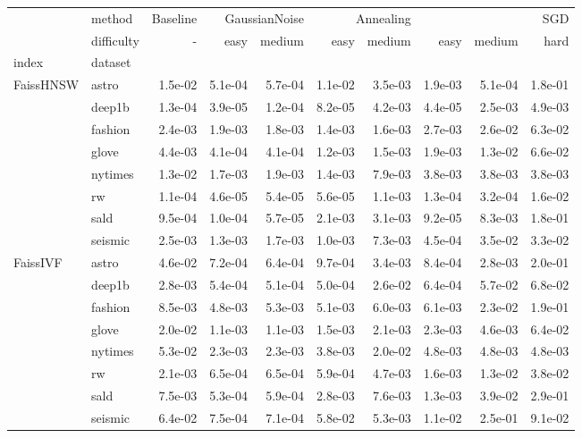 \begin{tabular}{llrrrrrrrr}
\toprule
 & method & Baseline & \multicolumn{2}{r}{GaussianNoise} & \multicolumn{2}{r}{Annealing} & \multicolumn{3}{r}{SGD} \\
 & difficulty & - & easy & medium & easy & medium & easy & medium & hard \\
index & dataset &  &  &  &  &  &  &  &  \\
\midrule
\multirow[t]{8}{*}{FaissHNSW} & astro & 1.5e-02 & 5.1e-04 & 5.7e-04 & 1.1e-02 & 3.5e-03 & 1.9e-03 & 5.1e-04 & 1.8e-01 \\
 & deep1b & 1.3e-04 & 3.9e-05 & 1.2e-04 & 8.2e-05 & 4.2e-03 & 4.4e-05 & 2.5e-03 & 4.9e-03 \\
 & fashion & 2.4e-03 & 1.9e-03 & 1.8e-03 & 1.4e-03 & 1.6e-03 & 2.7e-03 & 2.6e-02 & 6.3e-02 \\
 & glove & 4.4e-03 & 4.1e-04 & 4.1e-04 & 1.2e-03 & 1.5e-03 & 1.9e-03 & 1.3e-02 & 6.6e-02 \\
 & nytimes & 1.3e-02 & 1.7e-03 & 1.9e-03 & 1.4e-03 & 7.9e-03 & 3.8e-03 & 3.8e-03 & 3.8e-03 \\
 & rw & 1.1e-04 & 4.6e-05 & 5.4e-05 & 5.6e-05 & 1.1e-03 & 1.3e-04 & 3.2e-04 & 1.6e-02 \\
 & sald & 9.5e-04 & 1.0e-04 & 5.7e-05 & 2.1e-03 & 3.1e-03 & 9.2e-05 & 8.3e-03 & 1.8e-01 \\
 & seismic & 2.5e-03 & 1.3e-03 & 1.7e-03 & 1.0e-03 & 7.3e-03 & 4.5e-04 & 3.5e-02 & 3.3e-02 \\
\cline{1-10}
\multirow[t]{8}{*}{FaissIVF} & astro & 4.6e-02 & 7.2e-04 & 6.4e-04 & 9.7e-04 & 3.4e-03 & 8.4e-04 & 2.8e-03 & 2.0e-01 \\
 & deep1b & 2.8e-03 & 5.4e-04 & 5.1e-04 & 5.0e-04 & 2.6e-02 & 6.4e-04 & 5.7e-02 & 6.8e-02 \\
 & fashion & 8.5e-03 & 4.8e-03 & 5.3e-03 & 5.1e-03 & 6.0e-03 & 6.1e-03 & 2.3e-02 & 1.9e-01 \\
 & glove & 2.0e-02 & 1.1e-03 & 1.1e-03 & 1.5e-03 & 2.1e-03 & 2.3e-03 & 4.6e-03 & 6.4e-02 \\
 & nytimes & 5.3e-02 & 2.3e-03 & 2.3e-03 & 3.8e-03 & 2.0e-02 & 4.8e-03 & 4.8e-03 & 4.8e-03 \\
 & rw & 2.1e-03 & 6.5e-04 & 6.5e-04 & 5.9e-04 & 4.7e-03 & 1.6e-03 & 1.3e-02 & 3.8e-02 \\
 & sald & 7.5e-03 & 5.3e-04 & 5.9e-04 & 2.8e-03 & 7.6e-03 & 1.3e-03 & 3.9e-02 & 2.9e-01 \\
 & seismic & 6.4e-02 & 7.5e-04 & 7.1e-04 & 5.8e-02 & 5.3e-03 & 1.1e-02 & 2.5e-01 & 9.1e-02 \\

\end{tabular}
